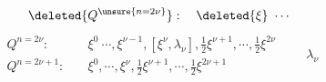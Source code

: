 \[
\deleted{Q^{\unsure{n=2\nu}}}:\quad \deleted{\xi}\ \cdots
\]
\[
\boxed{\begin{aligned}
Q^{n=2\nu}:\quad &\xi^0\ \cdots,\xi^{\nu-1},[\xi^\nu,\lambda_\nu],\tfrac12\xi^{\nu+1},\cdots,\tfrac12\xi^{2\nu}\\
Q^{n=2\nu+1}:\quad &\xi^0,\cdots,\xi^\nu,\tfrac12\xi^{\nu+1},\cdots,\tfrac12\xi^{2\nu+1}
\end{aligned}}\qquad \lambda_\nu
\]
